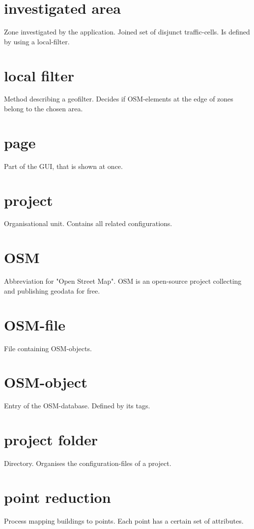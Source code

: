 \documentclass[letterpaper,10pt,english]{sphinxmanual}
\begin{document}
\section*{investigated area}
Zone investigated by the application. Joined set of disjunct traffic-cells. Is defined by using a local-filter.

\section*{local filter}
Method describing a geofilter. Decides if OSM-elements at the edge of zones belong to the chosen area.

\section*{page}
Part of the GUI, that is shown at once.

\section*{project}
Organisational unit. Contains all related configurations.

\section*{OSM}
Abbreviation for "Open Street Map". OSM is an open-source project collecting and publishing geodata for free.

\section*{OSM-file}
File containing OSM-objects.

\section*{OSM-object}
Entry of the OSM-database. Defined by its tags.

\section*{project folder}
Directory. Organises the configuration-files of a project.

\section*{point reduction}
Process mapping buildings to points. Each point has a certain set of attributes. 
\end{document}
